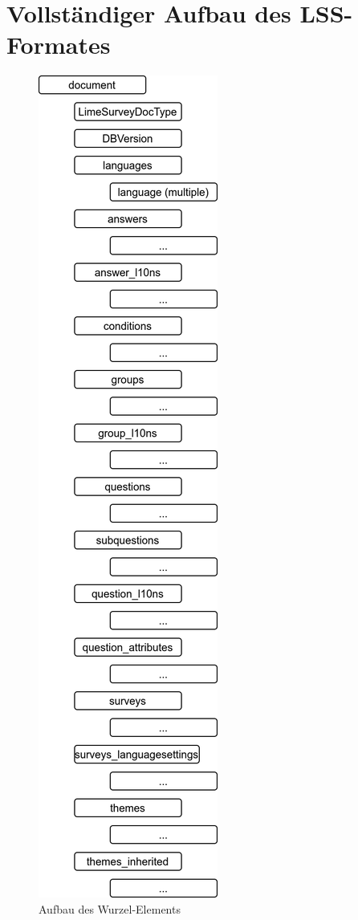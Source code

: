 \appendix

\chapter{Vollständiger Aufbau des LSS-Formates}
\label{app:lss}

\begin{figure}[h]
			\centering
			\includegraphics[width=.25\textwidth]{./img/append_lss.png}
			\caption{Aufbau des Wurzel-Elements }
\end{figure}

